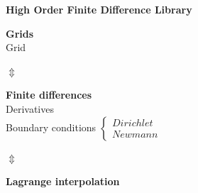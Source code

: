 \begin{framed}
{\Large{\textbf {High Order Finite Difference Library}}}\\

\begin{multicols}{2}

\begin{framed}
{\large{\textbf{Grids}}}\\

\hspace{0.5cm} Grid \hfill {}\\
\vspace{1.12cm}

\end{framed}

\begin{centering}

\begin{Huge}
$\Updownarrow$
\end{Huge}

\end{centering}

\columnbreak

\begin{framed}
{\large{\textbf{Finite differences}}}\\

\hspace{0.5cm} Derivatives \hfill {}\\

\hspace{0.5cm} Boundary conditions \hfill $\begin{cases}
\boxed{Dirichlet}\\ \boxed{Newmann}
\end{cases}$\\

\end{framed}

\begin{centering}

\begin{Huge}
$\Updownarrow$
\end{Huge}

\end{centering}

\end{multicols}


\begin{framed}

\begin{centering}

{{\textbf{Lagrange interpolation}}}

\end{centering}

\end{framed}



\end{framed}

